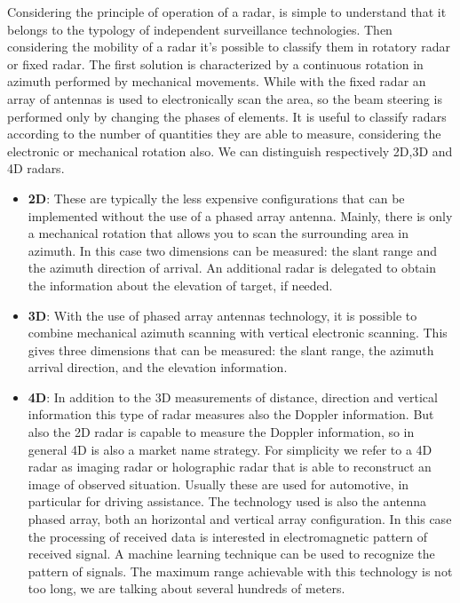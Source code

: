 Considering the principle of operation of a radar, is simple to understand that it belongs to the typology of independent surveillance technologies. Then considering the mobility of a radar it's possible to classify them in rotatory radar or fixed radar. The first solution is characterized by a continuous rotation in azimuth performed by mechanical movements. While with the fixed radar an array of antennas is used to electronically scan the area, so the beam steering is performed only by changing the phases of elements.
It is useful to classify radars according to the number of quantities they are able to measure, considering the electronic or mechanical rotation also.
We can distinguish respectively 2D,3D and 4D radars.
\begin{itemize}
     \item \textbf{2D}: These are typically the less expensive configurations that can be implemented without the use of a phased array antenna. Mainly, there is only a mechanical rotation that allows you to scan the surrounding area in azimuth. In this case two dimensions can be measured: the slant range and the azimuth direction of arrival. An additional radar is delegated to obtain the information about the elevation of target, if needed.
         
    \item \textbf{3D}: With the use of phased array antennas technology, it is possible to combine mechanical azimuth scanning with vertical electronic scanning. This gives three dimensions that can be measured: the slant range, the azimuth arrival direction, and the elevation information.
    
    \item \textbf{4D}: In addition to the 3D measurements of distance, direction and vertical information this type of radar measures also the Doppler information. But also the 2D radar is capable to measure the Doppler information, so in general 4D is also a market name strategy. For simplicity we refer to a 4D radar as imaging radar or holographic radar that is able to reconstruct an image of observed situation. Usually these are used for automotive, in particular for driving assistance. The technology used is also the antenna phased array, both an horizontal and vertical array configuration. In this case the processing of received data is interested in electromagnetic pattern of received signal. A machine learning technique can be used to recognize the pattern of signals. The maximum range achievable with this technology is not too long, we are talking about several hundreds of meters.

\end{itemize}


